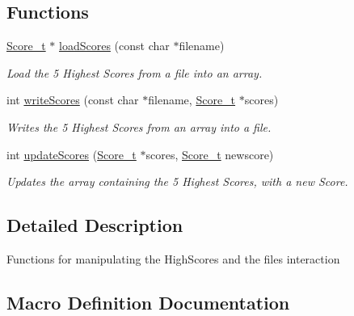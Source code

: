\subsection*{Functions}
\begin{DoxyCompactItemize}
\item 
\hyperlink{struct_score__t}{Score\+\_\+t} $\ast$ \hyperlink{group___highscores_ga860a7be33a6a7a627d2fafb624c9631f}{load\+Scores} (const char $\ast$filename)
\begin{DoxyCompactList}\small\item\em Load the 5 Highest Scores from a file into an array. \end{DoxyCompactList}\item 
int \hyperlink{group___highscores_gad0af57912ba7eaec7b5ed3c892b57c10}{write\+Scores} (const char $\ast$filename, \hyperlink{struct_score__t}{Score\+\_\+t} $\ast$scores)
\begin{DoxyCompactList}\small\item\em Writes the 5 Highest Scores from an array into a file. \end{DoxyCompactList}\item 
int \hyperlink{group___highscores_ga8a07ce6e6865afe87235689a394378cc}{update\+Scores} (\hyperlink{struct_score__t}{Score\+\_\+t} $\ast$scores, \hyperlink{struct_score__t}{Score\+\_\+t} newscore)
\begin{DoxyCompactList}\small\item\em Updates the array containing the 5 Highest Scores, with a new Score. \end{DoxyCompactList}\end{DoxyCompactItemize}


\subsection{Detailed Description}
Functions for manipulating the High\+Scores and the files interaction 

\subsection{Macro Definition Documentation}
\hypertarget{group___highscores_ga1942001a3372417b1fa0106acef995b3}{}\label{group___highscores_ga1942001a3372417b1fa0106acef995b3} 
